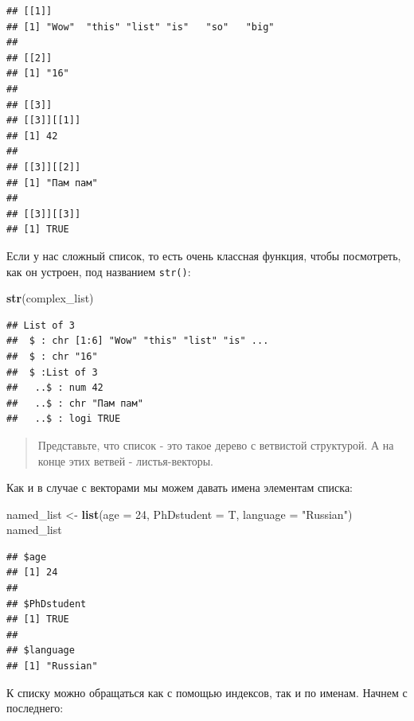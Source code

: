 \documentclass[]{book}
\newenvironment{Shaded}{\begin{snugshade}}{\end{snugshade}}
\newcommand{\KeywordTok}[1]{\textcolor[rgb]{0.13,0.29,0.53}{\textbf{#1}}}
\newcommand{\DataTypeTok}[1]{\textcolor[rgb]{0.13,0.29,0.53}{#1}}
\newcommand{\DecValTok}[1]{\textcolor[rgb]{0.00,0.00,0.81}{#1}}
\newcommand{\StringTok}[1]{\textcolor[rgb]{0.31,0.60,0.02}{#1}}
\newcommand{\OperatorTok}[1]{\textcolor[rgb]{0.81,0.36,0.00}{\textbf{#1}}}
\newcommand{\NormalTok}[1]{#1}
\begin{document}
\begin{verbatim}
## [[1]]
## [1] "Wow"  "this" "list" "is"   "so"   "big" 
## 
## [[2]]
## [1] "16"
## 
## [[3]]
## [[3]][[1]]
## [1] 42
## 
## [[3]][[2]]
## [1] "Пам пам"
## 
## [[3]][[3]]
## [1] TRUE
\end{verbatim}

Если у нас сложный список, то есть очень классная функция, чтобы
посмотреть, как он устроен, под названием \texttt{str()}:

\begin{Shaded}
\begin{Highlighting}[]
\KeywordTok{str}\NormalTok{(complex_list)}
\end{Highlighting}
\end{Shaded}

\begin{verbatim}
## List of 3
##  $ : chr [1:6] "Wow" "this" "list" "is" ...
##  $ : chr "16"
##  $ :List of 3
##   ..$ : num 42
##   ..$ : chr "Пам пам"
##   ..$ : logi TRUE
\end{verbatim}

\begin{quote}
Представьте, что список - это такое дерево с ветвистой структурой. А на
конце этих ветвей - листья-векторы.
\end{quote}

Как и в случае с векторами мы можем давать имена элементам списка:

\begin{Shaded}
\begin{Highlighting}[]
\NormalTok{named_list <-}\StringTok{ }\KeywordTok{list}\NormalTok{(}\DataTypeTok{age =} \DecValTok{24}\NormalTok{, }\DataTypeTok{PhDstudent =}\NormalTok{ T, }\DataTypeTok{language =} \StringTok{"Russian"}\NormalTok{)}
\NormalTok{named_list}
\end{Highlighting}
\end{Shaded}

\begin{verbatim}
## $age
## [1] 24
## 
## $PhDstudent
## [1] TRUE
## 
## $language
## [1] "Russian"
\end{verbatim}

К списку можно обращаться как с помощью индексов, так и по именам.
Начнем с последнего:

\begin{Shaded}
\end{Shaded}
\end{document}

